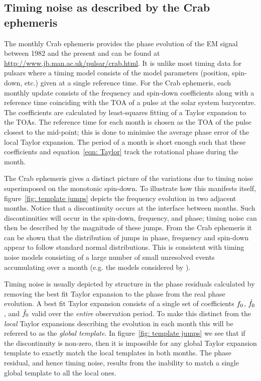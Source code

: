 \documentclass[../full_thesis/full_thesis.tex]{subfiles}
\begin{document}
\subsection{Timing noise as described by the Crab ephemeris}
\label{sec: timing noise as described by the crab ephemeris}
The monthly Crab ephemeris \citep{Lyne1993} provides the phase evolution of the
EM signal between 1982 and the present and can be found at
\url{http://www.jb.man.ac.uk/pulsar/crab.html}. It is unlike most timing data
for pulsars where a timing model consists of the model parameters (position, spin-down,
        etc.) given at a single reference time.
For the Crab ephemeris, each monthly update consists
of the frequency and spin-down coefficients along with a reference time
coinciding with the TOA of a pulse at the solar system barycentre. The
coefficients are calculated by  least-squares fitting of a Taylor expansion to
the TOAs. The reference time for each month is chosen as the TOA of
the pulse closest to the mid-point; this is done to minimise the average phase
error of the local Taylor expansion.  The period of a month is short enough
such that these coefficients and equation~\eqref{eqn: Taylor} track the
rotational phase during the month.

The Crab ephemeris gives a distinct picture of the variations due to timing
noise superimposed on the monotonic spin-down. To illustrate how this manifests
itself, figure~\ref{fig: template jumps} depicts the frequency evolution in two
adjacent months. Notice that a discontinuity occurs at the interface between
months.  Such discontinuities will occur in the spin-down, frequency, and
phase; timing noise can then be described by the magnitude of these jumps.
From the Crab ephemeris it can be shown that the distribution of jumps in
phase, frequency and spin-down appear to follow standard normal distributions.
This is consistent with timing noise models consisting of a large number of
small unresolved events accumulating over a month (e.g. the models considered
by \citet{Cordes1981}).

Timing noise is usually depicted by structure in the phase residuals calculated
by removing the best fit Taylor expansion to the phase from the real phase
evolution. A best fit Taylor expansion consists of a single set of coefficients
$f_{0}$, $\dot{f}_{0}$, and $\ddot{f}_{0}$ valid over the \emph{entire}
observation period. To make this distinct from the \emph{local} Taylor
expansions describing the evolution in each month this will be referred to as
the \emph{global template}.  In figure~\ref{fig: template jumps} we see that if
the discontinuity is non-zero, then it is impossible for any global Taylor
expansion template to exactly match the local templates in both months. The
phase residual, and hence timing noise, results from the inability to match a
single global template to all the local ones.
\end{document}
